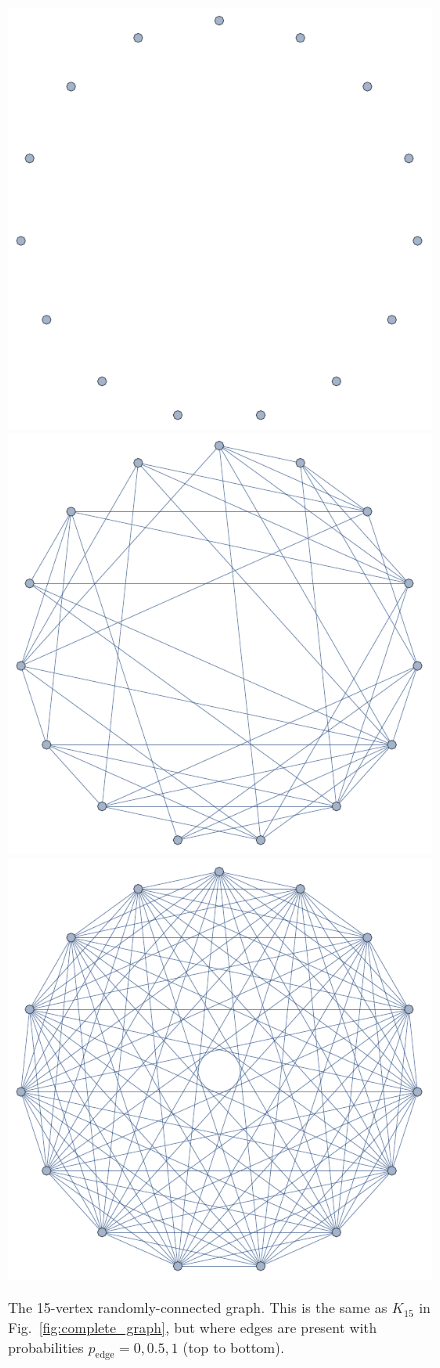 \documentclass[aps,rmp,twocolumn,amsmath,amssymb,nofootinbib,superscriptaddress,longbibliography,floatfix]{revtex4-1}
\begin{document}
\begin{figure}[!htb]
\includegraphics[width=0.6\columnwidth]{random_0}
\includegraphics[width=0.6\columnwidth]{random_05}
\includegraphics[width=0.6\columnwidth]{random_1}
\caption{The 15-vertex randomly-connected graph. This is the same as $K_{15}$ in Fig.~\ref{fig:complete_graph}, but where edges are present with probabilities \mbox{$p_\mathrm{edge}=0,0.5,1$} (top to bottom).} \label{fig:random_graph}
\end{figure}
\end{document}
